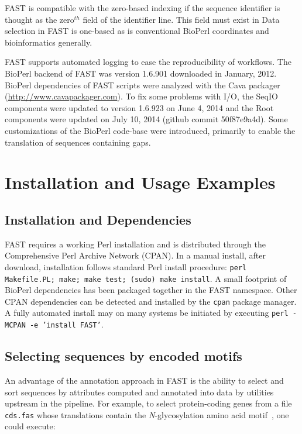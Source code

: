 \documentclass{frontiersSCNS} %
\begin{document}
FAST is compatible with the zero-based indexing if the sequence
identifier is thought as the zero$^{th}$ field of the identifier
line. This field must exist in Data selection in FAST is
one-based as is conventional BioPerl coordinates and bioinformatics
generally.

FAST supports automated logging to ease the reproducibility of
workflows. The BioPerl backend of FAST was version 1.6.901 downloaded in January,
2012. BioPerl dependencies of FAST scripts were analyzed with the Cava
packager (\url{http://www.cavapackager.com}). To fix some problems with
I/O, the SeqIO components were updated to version 1.6.923 on
June 4, 2014 and the Root components were updated on July 10, 2014 (github commit 50f87e9a4d). 
Some customizations of the BioPerl code-base were introduced, primarily 
to enable the translation of sequences containing gaps. 

\section{Installation and Usage Examples}

\subsection{Installation and Dependencies}
FAST requires a working Perl installation and is distributed through
the Comprehensive Perl Archive Network (CPAN). In a manual install,
after download, installation follows standard Perl install procedure:
{\tt perl Makefile.PL; make; make test; (sudo) make install}. A small
footprint of BioPerl dependencies has been packaged together in the
FAST namespace. Other CPAN dependencies can be detected and installed
by the {\tt cpan} package manager. A fully automated install may on
many systems be initiated by executing {\tt perl -MCPAN -e 'install
  FAST'}.

\subsection{Selecting sequences by encoded motifs }

An advantage of the annotation approach in FAST is the ability to
select and sort sequences by attributes computed and annotated into
data by utilities upstream in the pipeline. For example, to select
protein-coding genes from a file {\tt cds.fas} whose translations
contain the {\it N}-glycosylation amino acid
motif~\citep{KornfieldKornfield85}, one could execute:
\end{document}
